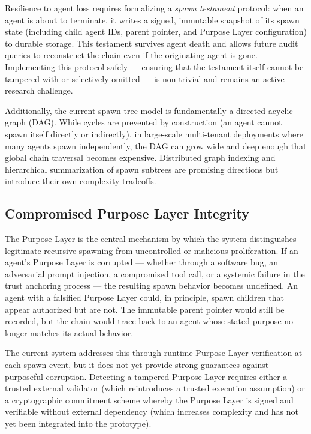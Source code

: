 Resilience to agent loss requires formalizing a \textit{spawn testament} protocol: when an agent is about to terminate, it writes a signed, immutable snapshot of its spawn state (including child agent IDs, parent pointer, and Purpose Layer configuration) to durable storage. This testament survives agent death and allows future audit queries to reconstruct the chain even if the originating agent is gone. Implementing this protocol safely — ensuring that the testament itself cannot be tampered with or selectively omitted — is non-trivial and remains an active research challenge.

Additionally, the current spawn tree model is fundamentally a directed acyclic graph (DAG). While cycles are prevented by construction (an agent cannot spawn itself directly or indirectly), in large-scale multi-tenant deployments where many agents spawn independently, the DAG can grow wide and deep enough that global chain traversal becomes expensive. Distributed graph indexing and hierarchical summarization of spawn subtrees are promising directions but introduce their own complexity tradeoffs.

\subsection{Compromised Purpose Layer Integrity}
The Purpose Layer is the central mechanism by which the system distinguishes legitimate recursive spawning from uncontrolled or malicious proliferation. If an agent's Purpose Layer is corrupted — whether through a software bug, an adversarial prompt injection, a compromised tool call, or a systemic failure in the trust anchoring process — the resulting spawn behavior becomes undefined. An agent with a falsified Purpose Layer could, in principle, spawn children that appear authorized but are not. The immutable parent pointer would still be recorded, but the chain would trace back to an agent whose stated purpose no longer matches its actual behavior.

The current system addresses this through runtime Purpose Layer verification at each spawn event, but it does not yet provide strong guarantees against purposeful corruption. Detecting a tampered Purpose Layer requires either a trusted external validator (which reintroduces a trusted execution assumption) or a cryptographic commitment scheme whereby the Purpose Layer is signed and verifiable without external dependency (which increases complexity and has not yet been integrated into the prototype).

